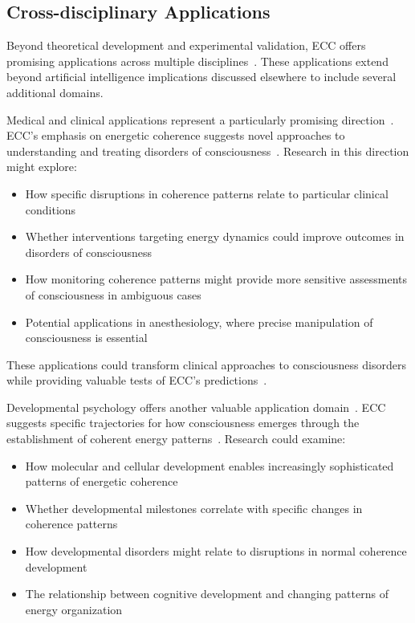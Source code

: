 \subsection*{Cross-disciplinary Applications}

Beyond theoretical development and experimental validation, ECC offers promising applications across multiple disciplines~\cite{varela2016embodied, thompson2014waking}. These applications extend beyond artificial intelligence implications discussed elsewhere to include several additional domains.

Medical and clinical applications represent a particularly promising direction~\cite{seth2021being, tononi2016integrated}. ECC's emphasis on energetic coherence suggests novel approaches to understanding and treating disorders of consciousness~\cite{Giacino2014, Laureys2004}. Research in this direction might explore:

\begin{itemize}
    \item How specific disruptions in coherence patterns relate to particular clinical conditions
    \item Whether interventions targeting energy dynamics could improve outcomes in disorders of consciousness
    \item How monitoring coherence patterns might provide more sensitive assessments of consciousness in ambiguous cases
    \item Potential applications in anesthesiology, where precise manipulation of consciousness is essential
\end{itemize}

These applications could transform clinical approaches to consciousness disorders while providing valuable tests of ECC's predictions~\cite{seth2021being, Dehaene2014}.

Developmental psychology offers another valuable application domain~\cite{feinberg2016ancient, thompson2014waking}. ECC suggests specific trajectories for how consciousness emerges through the establishment of coherent energy patterns~\cite{chalmers2010character}. Research could examine:

\begin{itemize}
    \item How molecular and cellular development enables increasingly sophisticated patterns of energetic coherence
    \item Whether developmental milestones correlate with specific changes in coherence patterns
    \item How developmental disorders might relate to disruptions in normal coherence development
    \item The relationship between cognitive development and changing patterns of energy organization
\end{itemize}

